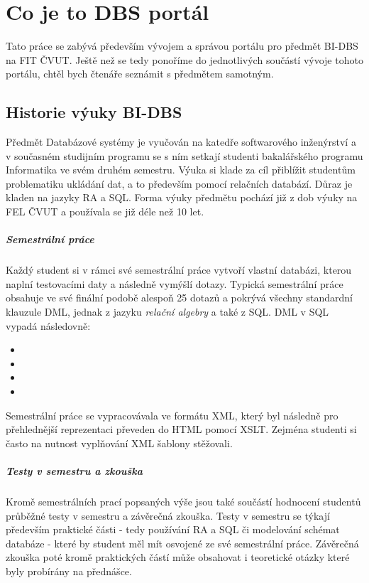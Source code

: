 \chapter{Co je to DBS portál} \label{DBSportal}

Tato práce se zabývá především vývojem a správou portálu pro předmět BI-DBS na FIT ČVUT. Ještě než se tedy ponoříme do jednotlivých součástí vývoje tohoto portálu, chtěl bych čtenáře seznámit s předmětem samotným.

\section{Historie výuky BI-DBS}

Předmět Databázové systémy je vyučován na katedře softwarového inženýrství a v současném studijním programu se s ním setkají studenti bakalářského programu Informatika ve svém druhém semestru. Výuka si klade za cíl přiblížit studentům problematiku ukládání dat, a to především pomocí relačních databází. Důraz je kladen na jazyky RA a SQL. Forma výuky předmětu pochází již z dob výuky na FEL ČVUT a používala se již déle než 10 let.

\paragraph{Semestrální práce}
Každý student si v rámci své semestrální práce vytvoří vlastní databázi, kterou naplní testovacími daty a následně vymýšlí dotazy. Typická semestrální práce obsahuje ve své finální podobě alespoň 25 dotazů a pokrývá všechny standardní klauzule DML, jednak z jazyku \emph{relační algebry} a také z SQL. DML v SQL vypadá následovně:
\begin{itemize}
	\item {}
	\item {}
	\item {}
	\item {}
\end{itemize}
Semestrální práce se vypracovávala ve formátu XML, který byl následně pro přehlednější reprezentaci převeden do HTML pomocí XSLT. Zejména studenti si často na nutnost vyplňování XML šablony stěžovali.

\paragraph{Testy v semestru a zkouška}
Kromě semestrálních prací popsaných výše jsou také součástí hodnocení studentů průběžné testy v semestru a závěrečná zkouška. Testy v semestru se týkají především praktické části - tedy používání RA a SQL či modelování schémat databáze - které by student měl mít osvojené ze své semestrální práce. Závěrečná zkouška poté kromě praktických částí může obsahovat i teoretické otázky které byly probírány na přednášce.

